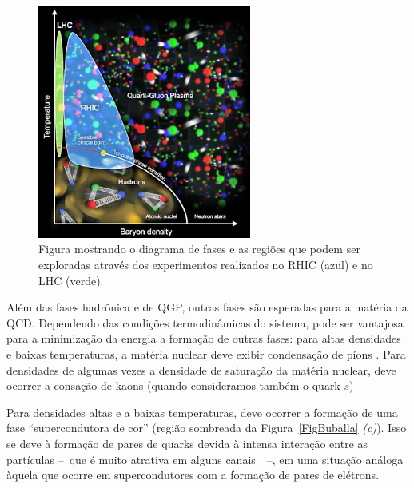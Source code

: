 \begin{figure}[!htb]
	\centering
	\includegraphics[width=7cm]{Figures/critical-point.jpg}
	\caption{Figura mostrando o diagrama de fases e as regiões que podem ser exploradas através dos experimentos realizados no RHIC (azul) e no LHC (verde).\label{FigRHIC}}
\end{figure}


Além das fases hadrônica e de QGP, outras fases são esperadas para a matéria da QCD. Dependendo das condições termodinâmicas do sistema, pode ser vantajosa para a minimização da energia a formação de outras fases: para altas densidades e baixas temperaturas, a matéria nuclear deve exibir condensação de píons \cite{Glendenning,Schaefer}. Para densidades de algumas vezes a densidade de saturação da matéria nuclear, deve ocorrer a consação de kaons (quando consideramos também o quark $s$)

Para densidades altas e a baixas temperaturas, deve ocorrer a formação de uma fase ``supercondutora de cor'' (região sombreada da Figura~\ref{FigBuballa} \emph{(c)}). Isso se deve à formação de pares de quarks devida à intensa interação entre as partículas --~que é muito atrativa em alguns canais~\cite{Weber}~--, em uma situação análoga àquela que ocorre em supercondutores com a formação de pares de elétrons.

